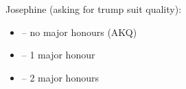 Josephine \ctr{5\nt} (asking for trump suit quality):
\begin{itemize}
  \item {} -- no major honours (AKQ)
  \item \ctr{6\c} -- 1 major honour
  \item {} -- 2 major honours
\end{itemize}
